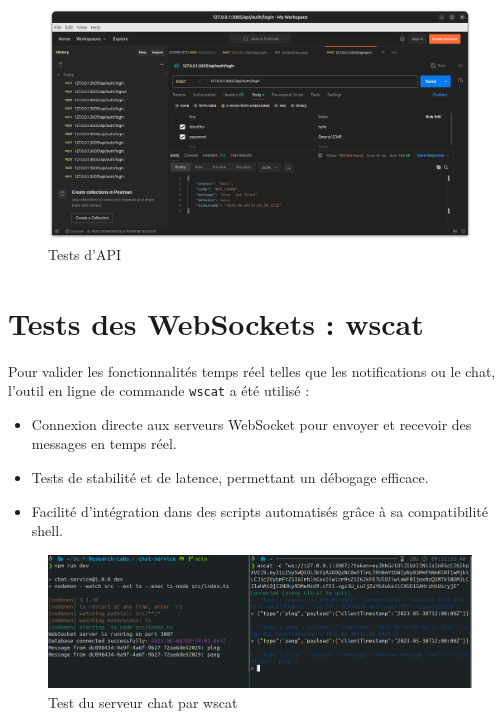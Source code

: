 \documentclass[12pt]{rapportPfe}
\begin{document}
\FloatBarrier
\begin{figure}[htbp]
    \centering
    \includegraphics[width=1.0\textwidth]{diagrams/ss_05.png}
    \caption{Tests d'API}
    \label{fig:diagram5}
\end{figure}

\section{Tests des WebSockets : wscat}

Pour valider les fonctionnalités temps réel telles que les notifications ou le chat, l’outil en ligne de commande \texttt{wscat} a été utilisé :

\begin{itemize}
    \item Connexion directe aux serveurs WebSocket pour envoyer et recevoir des messages en temps réel.
    \item Tests de stabilité et de latence, permettant un débogage efficace.
    \item Facilité d’intégration dans des scripts automatisés grâce à sa compatibilité shell.
\end{itemize}

\FloatBarrier
\begin{figure}[htbp]
    \centering
    \includegraphics[width=1.0\textwidth]{diagrams/ss_08.png}
    \caption{Test du serveur chat par wscat}
    \label{fig:diagram5}
\end{figure}
\end{document}
